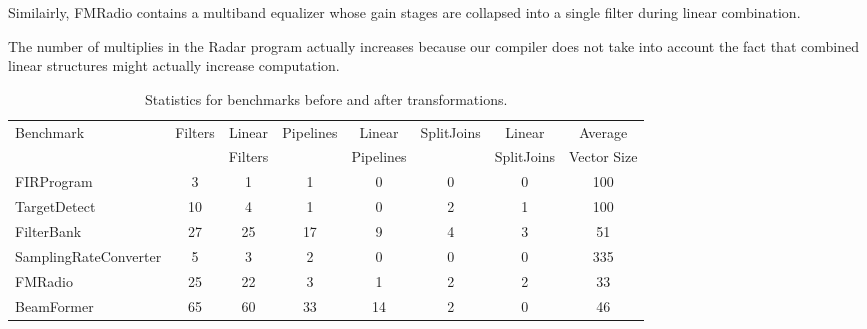 Similairly, FMRadio contains a multiband equalizer whose gain stages are collapsed
into a single filter during linear combination.

The number of multiplies in the Radar program actually increases because our 
compiler does not take into account the fact that combined linear structures 
might actually increase computation. %


\begin{table*}[t]
\begin{tabular}{|l|c|c||c|c||c|c||c|} 
\hline
Benchmark & Filters & Linear  & Pipelines & Linear    & SplitJoins & Linear     & Average  \\
          &         & Filters &           & Pipelines &            & SplitJoins & Vector Size\\
\hline
FIRProgram & 3 & 1 & 1 & 0 & 0 & 0 & 100 \\
\hline
TargetDetect & 10 & 4 & 1 & 0 & 2 & 1 & 100 \\
\hline
FilterBank & 27 & 25 & 17 & 9 & 4 & 3 & 51 \\
\hline
SamplingRateConverter & 5 & 3 & 2 & 0 & 0 & 0 & 335 \\
\hline
FMRadio & 25 & 22 & 3 & 1 & 2 & 2 & 33 \\
\hline
BeamFormer & 65 & 60 & 33 & 14 & 2 & 0 & 46 \\
\hline
\end{tabular}
\caption{Statistics for benchmarks before and after transformations.}
\label{fig:benchmark-stastics}
\end{table*}
